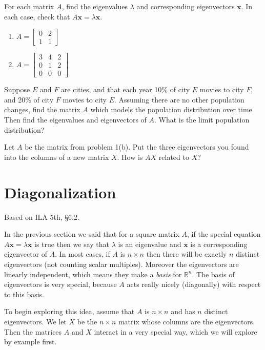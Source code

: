 \documentclass[11pt,oneside]{amsbook}
\newcommand{\R}{\mathbb R}
\theoremstyle{definition}
\theoremstyle{plain}
\theoremstyle{definition}
\theoremstyle{remark}
\numberwithin{equation}{section}
\numberwithin{figure}{section}
\newcounter{activityitem}
\newenvironment{activity}{\begin{list}{\arabic{activityitem}.}{\usecounter{activityitem}\setlength{\itemsep}{.2in}}}{\end{list}}
\begin{document}
\begin{activity}
  \item For each matrix $A$, find the eigenvalues $\lambda$ and corresponding eigenvectors $\bm{x}$. In each case, check that $A\bm{x}=\lambda\bm{x}$.
  \begin{enumerate}
    \item $A=\begin{bmatrix}0&2\\1&1\end{bmatrix}$
    \item $A=\begin{bmatrix}
      3 & 4 & 2 \\
      0 & 1 & 2 \\
      0 & 0 & 0
      \end{bmatrix}$
  \end{enumerate}
  \item Suppose $E$ and $F$ are cities, and that each year 10\% of city $E$ movies to city $F$, and 20\% of city $F$ movies to city $E$. Assuming there are no other population changes, find the matrix $A$ which models the population distribution over time. Then find the eigenvalues and eigenvectors of $A$. What is the limit population distribution?
  \item Let $A$ be the matrix from problem 1(b). Put the three eigenvectors you found into the columns of a new matrix $X$. How is $AX$ related to $X$?
\end{activity}


\newpage
\section{Diagonalization}

Based on ILA 5th, \S 6.2.

In the previous section we said that for a square matrix $A$, if the special equation $A\bm{x}=\lambda\bm{x}$ is true then we say that $\lambda$ is an eigenvalue and $\bm{x}$ is a corresponding eigenvector of $A$. In most cases, if $A$ is $n\times n$ then there will be exactly $n$ distinct eigenvectors (not counting scalar multiples). Moreover the eigenvectors are linearly independent, which means they make a \emph{basis} for $\R^n$. The basis of eigenvectors is very special, because $A$ acts really nicely (diagonally) with respect to this basis.

To begin exploring this idea, assume that $A$ is $n\times n$ and has $n$ distinct eigenvectors. We let $X$ be the $n\times n$ matrix whose columns are the eigenvectors. Then the matrices $A$ and $X$ interact in a very special way, which we will explore by example first.
\end{document}
